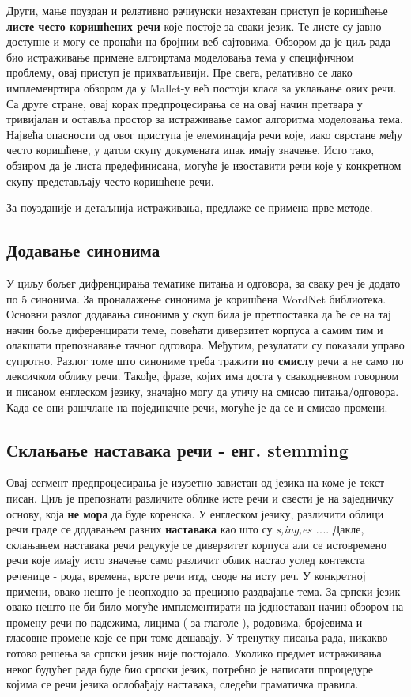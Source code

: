 Други, мање поуздан и релативно рачиунски незахтеван приступ је коришћење \textbf{листе често коришћених речи} које постоје за сваки језик. Те листе су јавно доступне и могу се пронаћи на бројним веб сајтовима. Обзором да је циљ рада био истраживање примене алгоиртама моделовања тема у специфичном проблему, овај приступ је прихватљивији. Пре свега, релативно се лако имплеменртира обзором да у Mallet-у већ постоји класа за уклањање ових речи. Са друге стране, овај корак предпроцесирања се на овај начин претвара у тривијалан и оставља простор за истраживање самог алгоритма моделовања тема. 
Највећа опасности од овог приступа је елеминација речи које, иако сврстане међу често коришћене, у датом скупу докумената ипак имају значење. Исто тако, обзиром да је листа предефинисана, могуће је изоставити речи које у конкретном скупу представљају често коришћене речи.

За поузданије и детаљнија истраживања, предлаже се примена прве методе. 
 
 	
	
	\subsection{Додавање синонима}
У циљу бољег дифренцирања тематике питања и одговора, за сваку реч је додато по 5  синонима. За проналажење синонима је коришћена WordNet библиотека. Основни разлог додавања синонима у скуп била је претпоставка да ће се на тај начин боље диференцирати теме, повећати диверзитет корпуса а самим тим и олакшати препознавање тачног одговора. Међутим, резулатати су показали управо супротно. Разлог томе што синониме треба тражити \textbf{по смислу} речи а не само по лексичком облику речи. Такође, фразе, којих има доста у свакодневном говорном и писаном енглеском језику, значајно могу да утичу на смисао питања/одговора. Када се они рашчлане на појединачне речи, могуће је да се и смисао промени.

	\subsection{Склањање наставака речи - енг. stemming}
	
Овај сегмент предпроцесирања је изузетно завистан од језика на коме је текст писан. Циљ је препознати различите облике исте речи и свести је на заједничку основу, која \textbf{не мора} да буде коренска. У енглеском језику, различити облици речи граде се додавањем разних \textbf{наставака} као што су \textit{s,ing,es ...}. Дакле, склањањем наставака речи редукује се диверзитет корпуса али се истовремено речи које имају исто значење само различит облик настао услед контекста реченице - рода, времена, врсте речи итд, своде на исту реч. У конкретној примени, овако нешто је неопходно за прецизно раздвајање тема. 
За српски језик овако нешто не би било могуће имплементирати на једноставан начин обзором на промену речи по падежима, лицима ( за глаголе ), родовима, бројевима и гласовне промене које се при томе дешавају. У тренутку писања рада, никакво готово решења за српски језик није постојало. Уколико предмет истраживања неког будућег рада буде био српски језик, потребно је написати ппроцедуре којима се речи језика ослобађају наставака, следећи граматичка правила.

